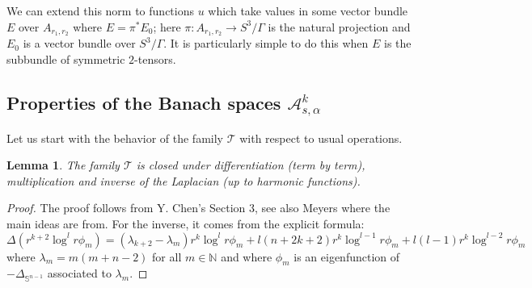 \documentclass[12pt]{article}
\newtheorem{lem}[thm]{Lemma}
\newtheorem{rem}[thm]{Remark}
\newcommand{\calA}{{\mathcal A}}
\begin{document}


We can extend this norm to functions $u$ which take values in some vector bundle $E$ over $A_{r_1, r_2}$ where
$E = \pi^* E_0$; here $\pi: A_{r_1, r_2} \to S^3/\Gamma$ is the natural projection and $E_0$ is a vector
bundle over $S^3/\Gamma$.  It is particularly simple to do this when $E$ is the subbundle of symmetric
$2$-tensors. 

\subsection{Properties of the Banach spaces $\calA^k_{s,\alpha}$} 

    Let us start with the behavior of the family $\mathcal{T}$ with respect to usual operations.
 
    \begin{lem}\label{stability T}
       The family $\mathcal{T}$ is closed under differentiation (term by term), multiplication and inverse of the Laplacian (up to harmonic functions).
    \end{lem}
    \begin{proof}
       The proof follows from Y. Chen's Section 3, see also Meyers where the main ideas are from. For the inverse, it comes from the explicit formula:
       \begin{equation}
           \Delta (r^{k+2}\log^l r\phi_m) = (\lambda_{k+2}-\lambda_m)r^k\log^l r\phi_m + l (n+2k+2)r^k\log^{l-1} r\phi_m + l(l-1)r^k\log^{l-2} r\phi_m\label{laplacien phg}
       \end{equation}
       where $\lambda_m = m(m+n-2)$ for all $m\in\mathbb{N}$ and where $\phi_m$ is an eigenfunction of $-\Delta_{\mathbb{S}^{n-1}}$ associated to $\lambda_m$.
    \end{proof}
       
\end{document}
